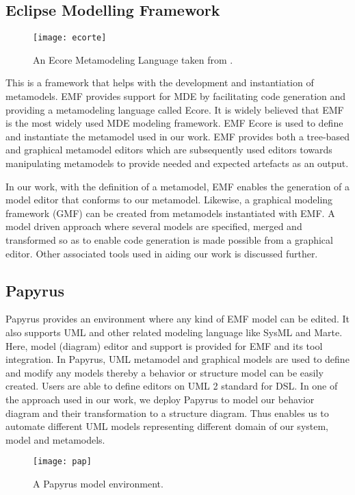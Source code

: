 \documentclass[12pt, a4paper]{report}
\begin{document}
\subsection{Eclipse Modelling Framework}

\begin{figure}[!ht]
  \centering
   \texttt{[image: ecorte]}
  \caption{ An Ecore Metamodeling Language taken from \cite{Steinberg:2009:EEM:1197540}.}
  \label{fig:mrad}
\end{figure}
This is a framework that helps with the development and instantiation of metamodels. EMF provides support for MDE by facilitating code generation and providing a metamodeling language called Ecore. It is widely believed that EMF is the most widely used MDE modeling framework. EMF Ecore is used to define and instantiate the metamodel used in our work. EMF provides both a tree-based and graphical metamodel editors which are subsequently used editors towards manipulating metamodels to provide needed and expected artefacts as an output.

In our work, with the definition of a metamodel, EMF enables the generation of a model editor that conforms to our metamodel. Likewise, a graphical modeling framework (GMF) can be created from metamodels instantiated with EMF. A model driven approach where several models are specified, merged and transformed so as to enable code generation is made possible from a graphical editor. Other associated tools used in aiding our work is discussed further.

\subsection{Papyrus}
Papyrus provides an environment where any kind of EMF model can be edited. It also supports UML and other related modeling language like SysML and Marte. Here, model (diagram) editor and support is provided for EMF and its tool integration. In Papyrus, UML metamodel and graphical models are used to define and modify any models thereby a behavior or structure model can be easily created. Users are able to define editors on UML 2 standard for DSL. In one of the approach used in our work, we deploy Papyrus to model our behavior diagram and their transformation to a structure diagram. Thus enables us to automate different UML models representing different domain of our system, model and metamodels.

\begin{figure}[!ht]
  \centering
   \texttt{[image: pap]}
  \caption{ A Papyrus model environment.}
  \label{fig:mrad}
\end{figure}
\end{document}
